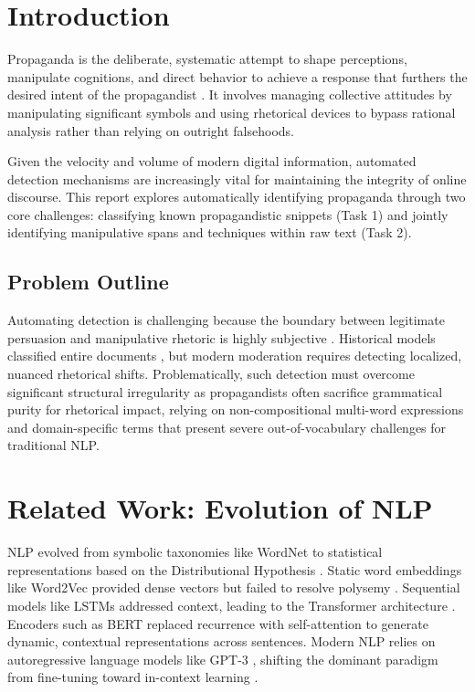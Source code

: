 \documentclass[12pt, a4paper]{article}
\begin{document}
\newpage
\section{Introduction}
\label{sec:introduction}
Propaganda is the deliberate, systematic attempt to shape perceptions, manipulate cognitions, and direct behavior to achieve a response that furthers the desired intent of the propagandist \cite{jowett2018}. It involves managing collective attitudes by manipulating significant symbols \cite{lasswell1927} and using rhetorical devices to bypass rational analysis rather than relying on outright falsehoods. 

Given the velocity and volume of modern digital information, automated detection mechanisms are increasingly vital for maintaining the integrity of online discourse. This report explores automatically identifying propaganda through two core challenges: classifying known propagandistic snippets (Task 1) and jointly identifying manipulative spans and techniques within raw text (Task 2).

\subsection{Problem Outline}
\label{subsec:problem_outline}
Automating detection is challenging because the boundary between legitimate persuasion and manipulative rhetoric is highly subjective \cite{dasan2019}. Historical models classified entire documents \cite{rashkin2017}, but modern moderation requires detecting localized, nuanced rhetorical shifts. Problematically, such detection must overcome significant structural irregularity as propagandists often sacrifice grammatical purity for rhetorical impact, relying on non-compositional multi-word expressions \cite{sag2002} and domain-specific terms that present severe out-of-vocabulary challenges for traditional NLP.

\section{Related Work: Evolution of NLP}
\label{sec:related_work}

NLP evolved from symbolic taxonomies like WordNet \cite{miller1995} to statistical representations based on the Distributional Hypothesis \cite{harris1954}. Static word embeddings like Word2Vec \cite{miklov2013} provided dense vectors but failed to resolve polysemy \cite{peters2018}. Sequential models like LSTMs \cite{hochreiter1997} addressed context, leading to the Transformer architecture \cite{vaswani2017}. Encoders such as BERT \cite{devlin2019} replaced recurrence with self-attention to generate dynamic, contextual representations across sentences. Modern NLP relies on autoregressive language models like GPT-3 \cite{brown2020}, shifting the dominant paradigm from fine-tuning toward in-context learning \cite{raffel2020}.
\end{document}
